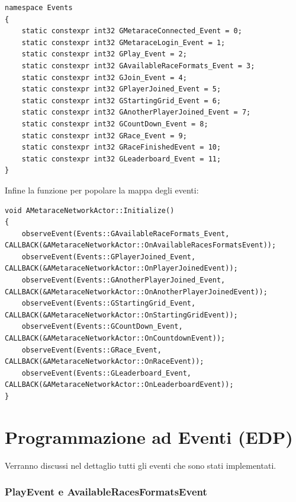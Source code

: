     \begin{lstlisting}[caption = Namespace in cui vengono definiti i le keys per la mappa degli eventi]
namespace Events
{
    static constexpr int32 GMetaraceConnected_Event = 0;
    static constexpr int32 GMetaraceLogin_Event = 1;
    static constexpr int32 GPlay_Event = 2;
    static constexpr int32 GAvailableRaceFormats_Event = 3;
    static constexpr int32 GJoin_Event = 4;
    static constexpr int32 GPlayerJoined_Event = 5;
    static constexpr int32 GStartingGrid_Event = 6;
    static constexpr int32 GAnotherPlayerJoined_Event = 7;
    static constexpr int32 GCountDown_Event = 8;
    static constexpr int32 GRace_Event = 9;
    static constexpr int32 GRaceFinishedEvent = 10;	
    static constexpr int32 GLeaderboard_Event = 11;
}
    \end{lstlisting}

    Infine la funzione per popolare la mappa degli eventi:

    \begin{lstlisting}[caption = Funzione Inizialize nel NetworkActor]
void AMetaraceNetworkActor::Initialize()
{	
	observeEvent(Events::GAvailableRaceFormats_Event, CALLBACK(&AMetaraceNetworkActor::OnAvailableRacesFormatsEvent));
	observeEvent(Events::GPlayerJoined_Event, CALLBACK(&AMetaraceNetworkActor::OnPlayerJoinedEvent));
	observeEvent(Events::GAnotherPlayerJoined_Event, CALLBACK(&AMetaraceNetworkActor::OnAnotherPlayerJoinedEvent));
	observeEvent(Events::GStartingGrid_Event, CALLBACK(&AMetaraceNetworkActor::OnStartingGridEvent));
	observeEvent(Events::GCountDown_Event, CALLBACK(&AMetaraceNetworkActor::OnCountdownEvent));
	observeEvent(Events::GRace_Event, CALLBACK(&AMetaraceNetworkActor::OnRaceEvent));
	observeEvent(Events::GLeaderboard_Event, CALLBACK(&AMetaraceNetworkActor::OnLeaderboardEvent));
}
    \end{lstlisting}

    \section{Programmazione ad Eventi (EDP)}
    
    Verranno discussi nel dettaglio tutti gli eventi che sono stati implementati.

        \subsubsection{PlayEvent e AvailableRacesFormatsEvent}


